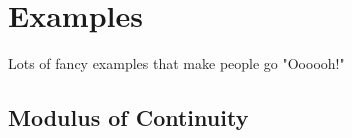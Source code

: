 \section{Examples}
\label{sec:examples}

Lots of fancy examples that make people go "Oooooh!"

\subsection{Modulus of Continuity}
\label{sec:we-show-modulus-of-continuity-example}

